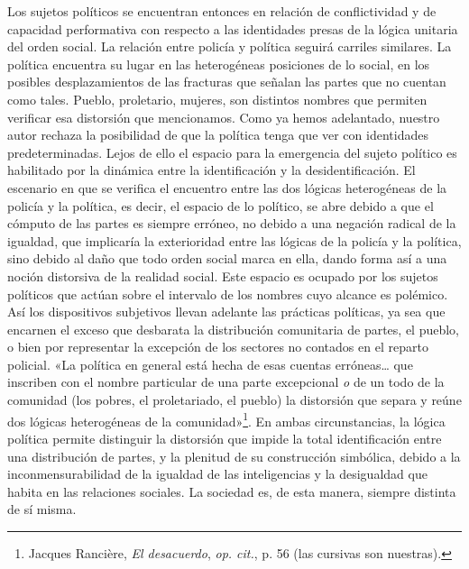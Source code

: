 Los sujetos políticos se encuentran entonces en relación de conflictividad y de capacidad performativa con respecto a las identidades presas de la lógica unitaria del orden social. La relación entre policía y política seguirá carriles similares. La política encuentra su lugar en las heterogéneas posiciones de lo social, en los posibles desplazamientos de las fracturas que señalan las partes que no cuentan como tales. Pueblo, proletario, mujeres, son distintos nombres que permiten verificar esa distorsión que mencionamos. Como ya hemos adelantado, nuestro autor rechaza la posibilidad de que la política tenga que ver con identidades predeterminadas. Lejos de ello el espacio para la emergencia del sujeto político es habilitado por la dinámica entre la identificación y la desidentificación. El escenario en que se verifica el encuentro entre las dos lógicas heterogéneas de la policía y la política, es decir, el espacio de lo político, se abre debido a que el cómputo de las partes es siempre erróneo, no debido a una negación radical de la igualdad, que implicaría la exterioridad entre las lógicas de la policía y la política, sino debido al daño que todo orden social marca en ella, dando forma así a una noción distorsiva de la realidad social. Este espacio es ocupado por los sujetos políticos que actúan sobre el intervalo de los nombres cuyo alcance es polémico. Así los dispositivos subjetivos llevan adelante las prácticas políticas, ya sea que encarnen el exceso que desbarata la distribución comunitaria de partes, el pueblo, o bien por representar la excepción de los sectores no contados en el reparto policial. «La política en general está hecha de esas cuentas erróneas\ldots{} que inscriben con el nombre particular de una parte excepcional \emph{o} de un todo de la comunidad (los pobres, el proletariado, el pueblo) la distorsión que separa y reúne dos lógicas heterogéneas de la comunidad»\footnote{Jacques Rancière, \emph{El desacuerdo}, \emph{op. cit.}, p. 56 (las cursivas son nuestras).}. En ambas circunstancias, la lógica política permite distinguir la distorsión que impide la total identificación entre una distribución de partes, y la plenitud de su construcción simbólica, debido a la inconmensurabilidad de la igualdad de las inteligencias y la desigualdad que habita en las relaciones sociales. La sociedad es, de esta manera, siempre distinta de sí misma.

